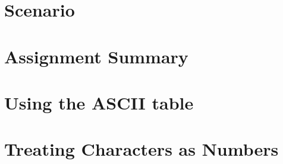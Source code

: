 





\renewcommand{\labnumber}{\keyboardlabnumber}
\renewcommand{\labname}{Bit Manipulation Lab}
\renewcommand{\shortlabname}{keyboardlab}
\renewcommand{\collaborationrules}{\keyboardlabcollaboration}
\renewcommand{\duedate}{\keyboardlabdue}

\newcommand{\tab}{\ensuremath{\longrightarrow}}
\newcommand{\nl}{\ensuremath{\hookleftarrow}}

\pagelayout

\labidentifier


\softwareengineeringfrontmatter

\section*{Scenario}                                                         \FirstDayOnTheJob

\section{Assignment Summary}                                                

\section{Using the ASCII table} \label{sec:asciiTable}                      

\section{Treating Characters as Numbers} \label{sec:charactersAsNumbers}    

